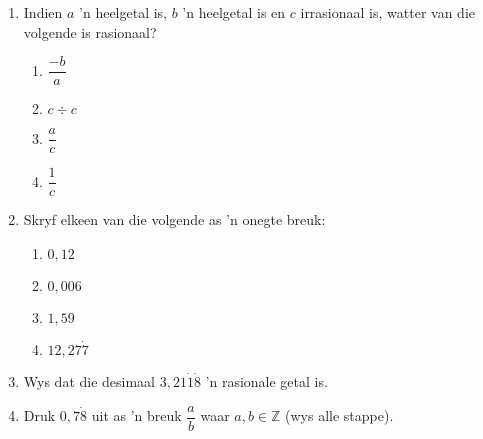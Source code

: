\begin{eocexercises}{}


\begin{enumerate}[itemsep=5pt, label=\textbf{\arabic*}. ] 
\item Indien $a$ ’n heelgetal is, $b$ ’n heelgetal is en $c$ irrasionaal is, watter van die volgende is rasionaal?
\begin{enumerate}[itemsep=5pt, label=\textbf{(\alph*)} ] 
    \item $\dfrac{-b}{a}$
    \item $c \div c$
    \item $\dfrac{a}{c}$
    \item $\dfrac{1}{c}$
    \end{enumerate}
\item Skryf elkeen van die volgende as ’n onegte breuk:
    \begin{enumerate}[itemsep=5pt, label=\textbf{(\alph*)} ] 
    \item $0,12$
    \item $0,006$
    \item $1,59$
    \item $12,27\dot{7}$
    \end{enumerate}
\item Wys dat die desimaal $3,21\dot{1}\dot{8}$ ’n rasionale getal is.
\item Druk  $0,7\dot{8}$ uit as ’n breuk $\dfrac{a}{b}$ waar $a,b\in \mathbb{Z}$ (wys alle stappe).




\end{enumerate}
\end{eocexercises}
